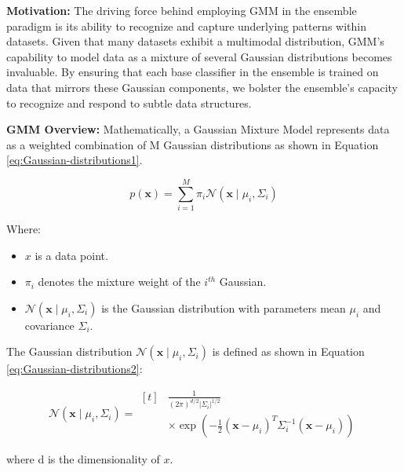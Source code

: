\documentclass[lettersize,journal]{IEEEtran}
\begin{document}
	\textbf{Motivation:} The driving force behind employing GMM in the ensemble paradigm is its ability to recognize and capture underlying patterns
	within datasets. Given that many datasets exhibit a multimodal distribution,
	GMM’s capability to model data as a mixture of several Gaussian distributions becomes invaluable. By ensuring that each base classifier in the ensemble is trained on data that mirrors these Gaussian components, we bolster
	the ensemble’s capacity to recognize and respond to subtle data structures.
	
	\textbf{GMM Overview:}
	Mathematically, a Gaussian Mixture Model represents data as a weighted combination of M Gaussian distributions as shown in Equation \ref{eq:Gaussian-distributions1}.
	
	\begin{equation}
		\label{eq:Gaussian-distributions1}
		p(\mathbf{x})=\sum_{i=1}^M \pi_i \mathcal{N}\left(\mathbf{x} \mid \mu_i, \Sigma_i\right)
	\end{equation}
	
	Where:
	\begin{itemize}
		\item $x$ is a data point.
		\item $\pi_i$ denotes the mixture weight of the $i^{{th }}$ Gaussian.
		\item $\mathcal{N}\left(\mathbf{x} \mid \mu_i, \Sigma_i\right)$ is the Gaussian distribution with parameters mean $\mu_i$ and covariance ${\Sigma}_i$.
	\end{itemize}
	
	The Gaussian distribution $\mathcal{N}\left(\mathbf{x} \mid \mu_i, {\Sigma}_i\right)$ is defined as shown in Equation \ref{eq:Gaussian-distributions2}:
	
	\begin{equation}
		\label{eq:Gaussian-distributions2}
		\mathcal{N}\left(\mathbf{x} \mid \mu_i, {\Sigma}_i\right) = 
		\begin{aligned}[t]
			&\frac{1}{(2 \pi)^{d / 2}\left|{\Sigma}_i\right|^{1 / 2}} \\
			&\times \exp \left(-\frac{1}{2}\left(\mathbf{x}-\mu_i\right)^T {\Sigma}_i^{-1}\left(\mathbf{x}-\mu_i\right)\right)
		\end{aligned}
	\end{equation}
	
	
	where d is the dimensionality of $x$.
	
\end{document}
